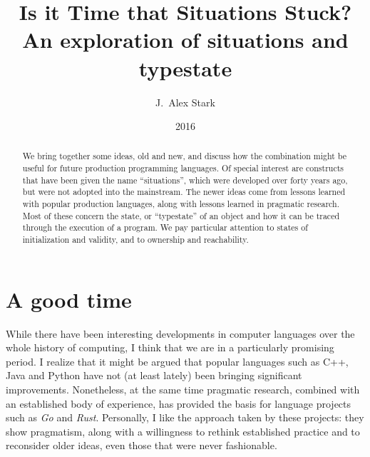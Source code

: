 \documentclass[10pt]{amsart}
\begin{document}


\title[Is it Time that Situations Stuck?]{%
  Is it Time that Situations Stuck?\\An exploration of situations
  and typestate}
\author{J.~Alex Stark}
\date{2016}


\begin{abstract}
  We bring together some ideas, old and new, and discuss how the
  combination might be useful for future production programming
  languages.  Of special interest are constructs that have been given
  the name ``situations'', which were developed over forty years ago,
  but were not adopted into the mainstream.  The newer ideas come from
  lessons learned with popular production languages, along with
  lessons learned in pragmatic research.  Most of these concern the
  state, or ``typestate'' of an object and how it can be traced
  through the execution of a program.  We pay particular attention to
  states of initialization and validity, and to ownership and
  reachability.
\end{abstract}



\maketitle

\tableofcontents
\listofcodex


\nocite{*}

\section{A good time}

While there have been interesting developments in computer languages
over the whole history of computing, I think that we are in a
particularly promising period.  I realize that it might be argued that
popular languages such as C++, Java and Python have not (at least
lately) been bringing significant improvements.  Nonetheless, at the
same time pragmatic research, combined with an established body of
experience, has provided the basis for language projects such as
\emph{Go} and \emph{Rust}.  Personally, I like the approach taken by
these projects: they show pragmatism, along with a willingness to
rethink established practice and to reconsider older ideas, even those
that were never fashionable.
\end{document}
